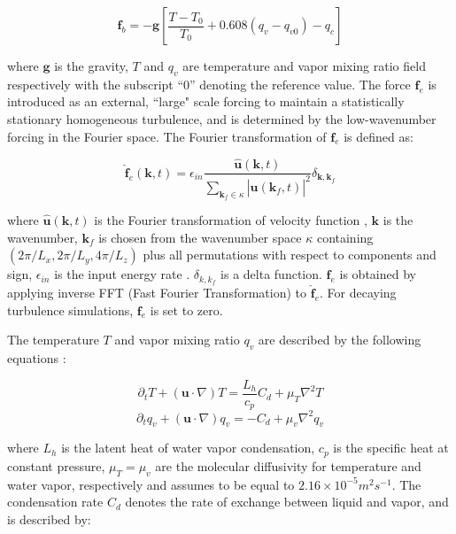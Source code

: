 \documentclass[draft,linenumbers]{agujournal}
\begin{document}
\begin{equation}
\mathbf{f}_b= 
-\mathbf{g}[\frac{T-T_{0}}{T_0}+0.608(q_{v}-q_{v0})-q_{c}]
\label{eq:source_term}
\end{equation}

where $\mathbf{g}$ is the gravity, $T$ and $q_{v}$ are temperature
and vapor mixing ratio field respectively with the subscript ``$0$''
denoting the reference value. The force $\mathbf{f}_e$ is introduced as an external, ``large" scale forcing to maintain a statistically stationary homogeneous turbulence, and is determined by the low-wavenumber forcing in the Fourier space. { The Fourier transformation of $\mathbf{f}_e$ is defined as:}

\begin{equation}
\mathbf{\hat{f}}_e(\mathbf{k},t) = \epsilon_{in}\frac{\mathbf{\hat{u}}(\mathbf{k},t)}
{\sum_{\mathbf{k}_f\in \kappa}|\mathbf{\hat{u}}(\mathbf{k}_f,t)|^2}
\delta_{\mathbf{k},\mathbf{k}_f}
\label{eq:fe}
\end{equation}

where { $\mathbf{\hat{u}}(\mathbf{k},t)$ is the Fourier transformation of velocity function , $\mathbf{k}$ is the wavenumber, $\mathbf{k}_f$ is chosen from the wavenumber space $\kappa$ containing $(2\pi/L_x,2\pi/L_y,4\pi/L_z)$ plus all permutations with respect to components and sign}, $\epsilon_{in}$ is the input energy rate \citep{ghosal1995dynamic}. $\delta_{k,k_f}$ is a delta function.  { $\mathbf{f}_e$ is obtained by applying inverse FFT (Fast Fourier Transformation) to $\mathbf{\hat{f}}_e$.} For decaying turbulence simulations, $\mathbf{f}_e$ is set to zero.

The temperature $T$ and vapor mixing ratio $q_v$ are described by the following equations \citep{Kumar11}:

\begin{equation}
\partial_{t}T+(\mathbf{u}\cdot\nabla)T=\frac{L_{h}}{c_{p}}C_{d}+\mu_{T}\nabla^{2}T\label{eq:Temp}
\end{equation}
\begin{equation}
\partial_{t}q_{v}+(\mathbf{u}\cdot\nabla)q_{v}=-C_{d}+\mu_{v}\nabla^{2}q_{v}\label{eq:Vapor}
\end{equation}

where $L_{h}$ is the latent heat of water vapor condensation,
$c_{p}$ is the specific heat at constant pressure, $\mu_{T}=\mu_{v}$ are
the molecular diffusivity for temperature and water vapor, respectively
and assumes to be equal to $2.16\times 10^{-5}m^2s^{-1}$. The condensation rate $C_{d}$ denotes the rate of exchange between liquid and vapor, and is described by:
\end{document}
